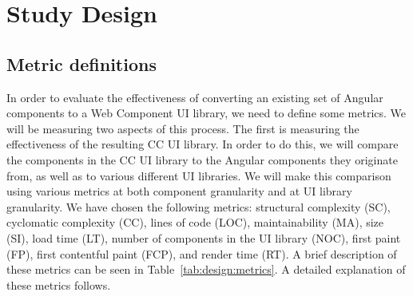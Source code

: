 \section{Study Design}\label{sec:design}

\subsection{Metric definitions}
In order to evaluate the effectiveness of converting an existing set of Angular components to a Web Component UI library, we need to define some metrics. We will be measuring two aspects of this process. The first is measuring the effectiveness of the resulting CC UI library. In order to do this, we will compare the components in the CC UI library to the Angular components they originate from, as well as to various different UI libraries. We will make this comparison using various metrics at both component granularity and at UI library granularity. We have chosen the following metrics: structural complexity (SC), cyclomatic complexity (CC), lines of code (LOC), maintainability (MA), size (SI), load time (LT), number of components in the UI library (NOC), first paint (FP), first contentful paint (FCP), and render time (RT).  A brief description of these metrics can be seen in Table~\ref{tab:design:metrics}. A detailed explanation of these metrics follows.


